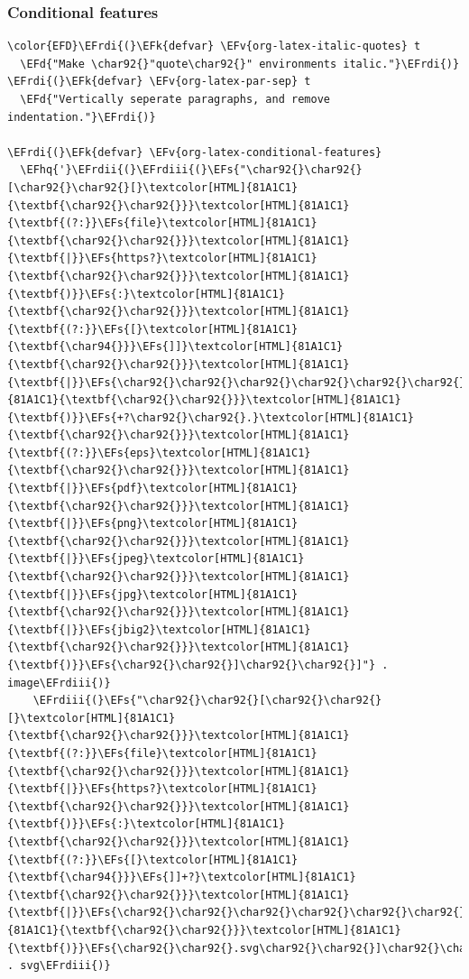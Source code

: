 \documentclass{scrartcl}
\newcommand{\EFk}[1]{\textcolor{EFk}{#1}} %
\newcommand{\EFd}[1]{\textcolor{EFd}{#1}} %
\newcommand{\EFs}[1]{\textcolor{EFs}{#1}} %
\newcommand{\EFv}[1]{\textcolor{EFv}{#1}} %
\newcommand{\EFhq}[1]{#1} %
\newcommand{\EFrdi}[1]{#1} %
\newcommand{\EFrdii}[1]{#1} %
\newcommand{\EFrdiii}[1]{#1} %
\begin{document}
\subsubsection{Conditional features}
\label{sec:org4260921}
\begin{Code}
\begin{Verbatim}[]
\color{EFD}\EFrdi{(}\EFk{defvar} \EFv{org-latex-italic-quotes} t
  \EFd{"Make \char92{}"quote\char92{}" environments italic."}\EFrdi{)}
\EFrdi{(}\EFk{defvar} \EFv{org-latex-par-sep} t
  \EFd{"Vertically seperate paragraphs, and remove indentation."}\EFrdi{)}

\EFrdi{(}\EFk{defvar} \EFv{org-latex-conditional-features}
  \EFhq{'}\EFrdii{(}\EFrdiii{(}\EFs{"\char92{}\char92{}[\char92{}\char92{}[}\textcolor[HTML]{81A1C1}{\textbf{\char92{}\char92{}}}\textcolor[HTML]{81A1C1}{\textbf{(?:}}\EFs{file}\textcolor[HTML]{81A1C1}{\textbf{\char92{}\char92{}}}\textcolor[HTML]{81A1C1}{\textbf{|}}\EFs{https?}\textcolor[HTML]{81A1C1}{\textbf{\char92{}\char92{}}}\textcolor[HTML]{81A1C1}{\textbf{)}}\EFs{:}\textcolor[HTML]{81A1C1}{\textbf{\char92{}\char92{}}}\textcolor[HTML]{81A1C1}{\textbf{(?:}}\EFs{[}\textcolor[HTML]{81A1C1}{\textbf{\char94{}}}\EFs{]]}\textcolor[HTML]{81A1C1}{\textbf{\char92{}\char92{}}}\textcolor[HTML]{81A1C1}{\textbf{|}}\EFs{\char92{}\char92{}\char92{}\char92{}\char92{}\char92{}]}\textcolor[HTML]{81A1C1}{\textbf{\char92{}\char92{}}}\textcolor[HTML]{81A1C1}{\textbf{)}}\EFs{+?\char92{}\char92{}.}\textcolor[HTML]{81A1C1}{\textbf{\char92{}\char92{}}}\textcolor[HTML]{81A1C1}{\textbf{(?:}}\EFs{eps}\textcolor[HTML]{81A1C1}{\textbf{\char92{}\char92{}}}\textcolor[HTML]{81A1C1}{\textbf{|}}\EFs{pdf}\textcolor[HTML]{81A1C1}{\textbf{\char92{}\char92{}}}\textcolor[HTML]{81A1C1}{\textbf{|}}\EFs{png}\textcolor[HTML]{81A1C1}{\textbf{\char92{}\char92{}}}\textcolor[HTML]{81A1C1}{\textbf{|}}\EFs{jpeg}\textcolor[HTML]{81A1C1}{\textbf{\char92{}\char92{}}}\textcolor[HTML]{81A1C1}{\textbf{|}}\EFs{jpg}\textcolor[HTML]{81A1C1}{\textbf{\char92{}\char92{}}}\textcolor[HTML]{81A1C1}{\textbf{|}}\EFs{jbig2}\textcolor[HTML]{81A1C1}{\textbf{\char92{}\char92{}}}\textcolor[HTML]{81A1C1}{\textbf{)}}\EFs{\char92{}\char92{}]\char92{}\char92{}]"} . image\EFrdiii{)}
    \EFrdiii{(}\EFs{"\char92{}\char92{}[\char92{}\char92{}[}\textcolor[HTML]{81A1C1}{\textbf{\char92{}\char92{}}}\textcolor[HTML]{81A1C1}{\textbf{(?:}}\EFs{file}\textcolor[HTML]{81A1C1}{\textbf{\char92{}\char92{}}}\textcolor[HTML]{81A1C1}{\textbf{|}}\EFs{https?}\textcolor[HTML]{81A1C1}{\textbf{\char92{}\char92{}}}\textcolor[HTML]{81A1C1}{\textbf{)}}\EFs{:}\textcolor[HTML]{81A1C1}{\textbf{\char92{}\char92{}}}\textcolor[HTML]{81A1C1}{\textbf{(?:}}\EFs{[}\textcolor[HTML]{81A1C1}{\textbf{\char94{}}}\EFs{]]+?}\textcolor[HTML]{81A1C1}{\textbf{\char92{}\char92{}}}\textcolor[HTML]{81A1C1}{\textbf{|}}\EFs{\char92{}\char92{}\char92{}\char92{}\char92{}\char92{}]}\textcolor[HTML]{81A1C1}{\textbf{\char92{}\char92{}}}\textcolor[HTML]{81A1C1}{\textbf{)}}\EFs{\char92{}\char92{}.svg\char92{}\char92{}]\char92{}\char92{}]"} . svg\EFrdiii{)}

\end{Verbatim}
\end{Code}
\end{document}
